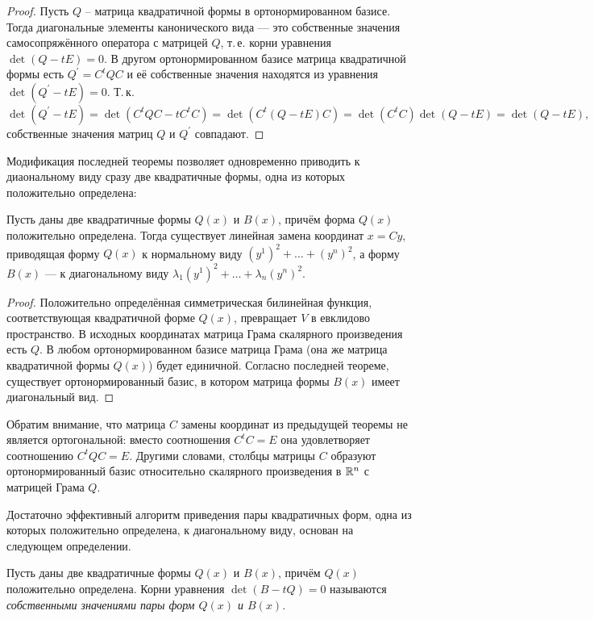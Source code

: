 \begin{proof}
    Пусть $Q$ -- матрица квадратичной формы в ортонормированном базисе. Тогда диагональные элементы канонического вида --- это собственные значения самосопряжённого оператора с матрицей $Q$, т.\,е. корни уравнения $\det(Q - tE) = 0$. В другом ортонормированном базисе матрица квадратичной формы есть $Q^\prime = C^tQC$ и её собственные значения находятся из уравнения $\det(Q^\prime - tE) = 0$. Т.\,к.
    \[
        \det(Q^\prime - tE) = \det(C^tQC - tC^tC) = \det(C^t(Q - tE)C) = \det(C^tC)\det(Q - tE) = \det(Q - tE),
    \]
    собственные значения матриц $Q$ и $Q^\prime$ совпадают.
\end{proof}

Модификация последней теоремы позволяет одновременно приводить к диаональному виду сразу две квадратичные формы, одна из которых положительно определена:

\begin{theorem}
    Пусть даны две квадратичные формы $Q(x)$ и $B(x)$, причём форма $Q(x)$ положительно определена. Тогда существует линейная замена координат $x = Cy$, приводящая форму $Q(x)$ к нормальному виду $(y^1)^2 + \ldots + (y^n)^2$, а форму $B(x)$ --- к диагональному виду $\lambda_1(y^1)^2 + \ldots + \lambda_n(y^n)^2$.
\end{theorem}

\begin{proof}
    Положительно определённая симметрическая билинейная функция, соответствующая квадратичной форме $Q(x)$, превращает $V$ в евклидово пространство. В исходных координатах матрица Грама скалярного произведения есть $Q$. В любом ортонормированном базисе матрица Грама (она же матрица квадратичной формы $Q(x)$) будет единичной. Согласно последней теореме, существует ортонормированный базис, в котором матрица формы $B(x)$ имеет диагональный вид.
\end{proof}

Обратим внимание, что матрица $C$ замены координат из предыдущей теоремы не является ортогональной: вместо соотношения $C^tC = E$ она удовлетворяет соотношению $C^tQC = E$. Другими словами, столбцы матрицы $C$ образуют ортонормированный базис относительно скалярного произведения в $\mathbb{R}^n$ с матрицей Грама $Q$.

Достаточно эффективный алгоритм приведения пары квадратичных форм, одна из которых положительно определена, к диагональному виду, основан на следующем определении.

\begin{definition}
    Пусть даны две квадратичные формы $Q(x)$ и $B(x)$, причём $Q(x)$ положительно определена. Корни уравнения $\det(B - tQ) = 0$ называются \textit{собственными значениями пары форм $Q(x)$ и $B(x)$}.
\end{definition}

